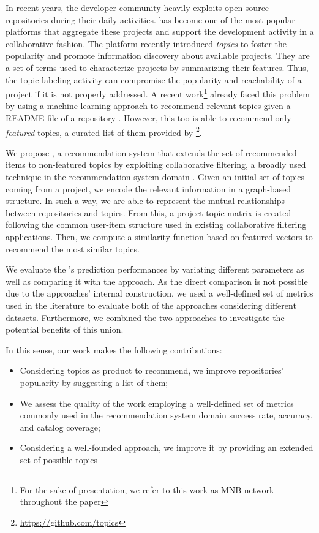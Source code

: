 In recent years, the developer community heavily exploits open source repositories during their daily activities. \GH has become one of the most
popular platforms that aggregate these projects and
support the development activity in a collaborative fashion.
%
The platform recently introduced \emph{topics} to foster the popularity and promote information discovery about available projects. They are a set of terms used to characterize projects by summarizing their features.  
Thus, the topic labeling activity can compromise the popularity and reachability of a project if it is not properly addressed. A recent work\footnote{For the sake of presentation, we refer to this work as MNB network throughout the paper} already faced this problem by using a machine learning approach to recommend relevant topics given a README file of a repository \cite{10.1145/3383219.3383227}. However, this too is able to recommend only \emph{featured} topics, a curated list of them provided by \GH\footnote{\url{https://github.com/topics}}.
 
We propose \CT, a recommendation system that extends the set of recommended items to non-featured topics by exploiting collaborative filtering, a broadly used technique in the recommendation system domain \cite{Schafer:2007:CFR:1768197.1768208}. Given an initial set of topics coming from a \GH project, we encode the relevant information in a graph-based structure. In such a way, we are able to represent the mutual relationships between repositories and topics. From this, a project-topic matrix is created following the common user-item structure used in existing collaborative filtering applications. Then, we compute a similarity function based on featured vectors to recommend the most similar topics.

We evaluate the \CT's prediction performances by variating different parameters as well as comparing it with the \MNB approach. As the direct comparison is not possible due to the approaches' internal construction, we used a well-defined set of metrics used in the literature to evaluate both of the approaches considering different datasets. Furthermore, we combined the two approaches to investigate the potential benefits of this union. 

In this sense, our work makes the following contributions:
\begin{itemize}
\item Considering \GH topics as product to recommend, we improve repositories' popularity by suggesting a list of them;
\item We assess the quality of the work employing a well-defined set of metrics commonly used in the recommendation system domain \ie success rate, accuracy, and catalog coverage;
\item Considering a well-founded approach, we improve it by providing an extended set of possible topics  
\end{itemize}

